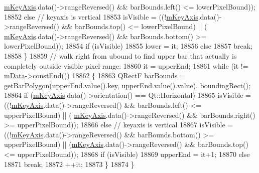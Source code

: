 \begin{DoxyCode}
      \hyperlink{class_q_c_p_abstract_plottable_a426f42e254d0f8ce5436a868c61a6827}{mKeyAxis}.data()->rangeReversed() && barBounds.left() <= lowerPixelBound));
18852     \textcolor{keywordflow}{else} \textcolor{comment}{// keyaxis is vertical}
18853       isVisible = ((!\hyperlink{class_q_c_p_abstract_plottable_a426f42e254d0f8ce5436a868c61a6827}{mKeyAxis}.data()->rangeReversed() && barBounds.top() <= lowerPixelBound) || (
      \hyperlink{class_q_c_p_abstract_plottable_a426f42e254d0f8ce5436a868c61a6827}{mKeyAxis}.data()->rangeReversed() && barBounds.bottom() >= lowerPixelBound));
18854     \textcolor{keywordflow}{if} (isVisible)
18855       lower = it;
18856     \textcolor{keywordflow}{else}
18857       \textcolor{keywordflow}{break};
18858   \}
18859   \textcolor{comment}{// walk right from ubound to find upper bar that actually is completely outside visible pixel range:}
18860   it = upperEnd;
18861   \textcolor{keywordflow}{while} (it != \hyperlink{class_q_c_p_bars_aef28d29d51ef84b608ecd22c55d531ff}{mData}->constEnd())
18862   \{
18863     QRectF barBounds = \hyperlink{class_q_c_p_bars_a1d118a76662cfd691a78c6f573e3f78c}{getBarPolygon}(upperEnd.value().key, upperEnd.value().value).
      boundingRect();
18864     \textcolor{keywordflow}{if} (\hyperlink{class_q_c_p_abstract_plottable_a426f42e254d0f8ce5436a868c61a6827}{mKeyAxis}.data()->orientation() == Qt::Horizontal)
18865       isVisible = ((!\hyperlink{class_q_c_p_abstract_plottable_a426f42e254d0f8ce5436a868c61a6827}{mKeyAxis}.data()->rangeReversed() && barBounds.left() <= upperPixelBound) || (
      \hyperlink{class_q_c_p_abstract_plottable_a426f42e254d0f8ce5436a868c61a6827}{mKeyAxis}.data()->rangeReversed() && barBounds.right() >= upperPixelBound));
18866     \textcolor{keywordflow}{else} \textcolor{comment}{// keyaxis is vertical}
18867       isVisible = ((!\hyperlink{class_q_c_p_abstract_plottable_a426f42e254d0f8ce5436a868c61a6827}{mKeyAxis}.data()->rangeReversed() && barBounds.bottom() >= upperPixelBound) || 
      (\hyperlink{class_q_c_p_abstract_plottable_a426f42e254d0f8ce5436a868c61a6827}{mKeyAxis}.data()->rangeReversed() && barBounds.top() <= upperPixelBound));
18868     \textcolor{keywordflow}{if} (isVisible)
18869       upperEnd = it+1;
18870     \textcolor{keywordflow}{else}
18871       \textcolor{keywordflow}{break};
18872     ++it;
18873   \}
18874 \}
\end{DoxyCode}


